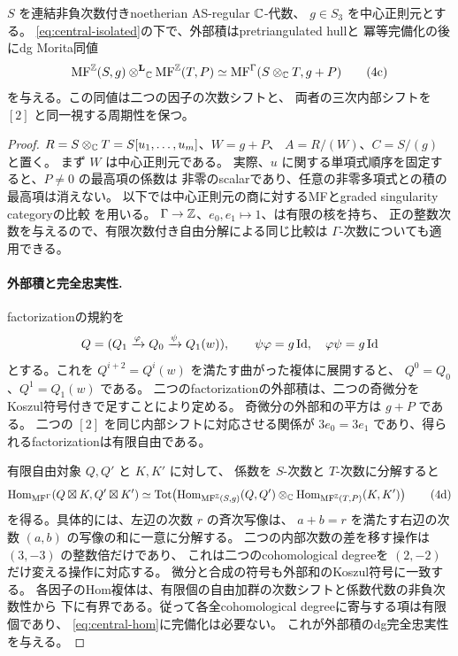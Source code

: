 \begin{lemma}[任意の孤立中心三次式に対する外部積]\label{lem:TS}
 \(S\) を連結非負次数付きnoetherian AS-regular \(\mathbb C\)-代数、
 \(g\in S_3\) を中心正則元とする。
 \eqref{eq:central-isolated}の下で、外部積はpretriangulated hullと
 冪等完備化の後にdg Morita同値
 \[
 \operatorname{MF}^\mathbb Z(S,g)\mathbin{\otimes^{\mathbf L}}_\mathbb C\operatorname{MF}^\mathbb Z(T,P)
 \simeq
 \operatorname{MF}^\Gamma(S\otimes_\mathbb C T,g+P)                             \tag{4c}\label{eq:central-TS}
 \]
 を与える。この同値は二つの因子の次数シフトと、
 両者の三次内部シフトを \([2]\) と同一視する周期性を保つ。
\end{lemma}
\begin{proof}
 \(R=S\otimes_\mathbb C T=S[u_1,\ldots,u_m]\)、\(W=g+P\)、
 \(A=R/(W)\)、\(C=S/(g)\) と置く。
 まず \(W\) は中心正則元である。
 実際、\(u\) に関する単項式順序を固定すると、\(P\ne0\) の最高項の係数は
 非零のscalarであり、任意の非零多項式との積の最高項は消えない。
 以下では中心正則元の商に対するMFとgraded singularity categoryの比較
 \cite[Theorem 5.8]{CCKM}を用いる。
 \(\Gamma\to\mathbb Z\)、\(e_0,e_1\mapsto1\)、は有限の核を持ち、
 正の整数次数を与えるので、有限次数付き自由分解による同じ比較は
 \(\Gamma\)-次数についても適用できる。

 \paragraph{外部積と完全忠実性.}
 factorizationの規約を
 \[
 Q=(Q_1\xrightarrow{\varphi}Q_0
                  \xrightarrow{\psi}Q_1(w)),\qquad
 \psi\varphi=g\operatorname{Id},\quad\varphi\psi=g\operatorname{Id}
 \]
 とする。これを \(Q^{i+2}=Q^i(w)\) を満たす曲がった複体に展開すると、
 \(Q^0=Q_0\)、\(Q^1=Q_1(w)\) である。
 二つのfactorizationの外部積は、二つの奇微分をKoszul符号付きで足すことにより定める。
 奇微分の外部和の平方は \(g+P\) である。
 二つの \([2]\) を同じ内部シフトに対応させる関係が
 \(3e_0=3e_1\) であり、得られるfactorizationは有限自由である。

 有限自由対象 \(Q,Q'\) と \(K,K'\) に対して、
 係数を \(S\)-次数と \(T\)-次数に分解すると
 \[
 \operatorname{Hom}_{\operatorname{MF}^\Gamma}(Q\boxtimes K,Q'\boxtimes K')
 \simeq
 \operatorname{Tot}\!\left(
   \operatorname{Hom}_{\operatorname{MF}^\mathbb Z(S,g)}(Q,Q')\otimes_\mathbb C
   \operatorname{Hom}_{\operatorname{MF}^\mathbb Z(T,P)}(K,K')\right)                         \tag{4d}\label{eq:central-hom}
 \]
 を得る。具体的には、左辺の次数 \(r\) の斉次写像は、
 \(a+b=r\) を満たす右辺の次数 \((a,b)\) の写像の和に一意に分解する。
 二つの内部次数の差を移す操作は \((3,-3)\) の整数倍だけであり、
 これは二つのcohomological degreeを \((2,-2)\) だけ変える操作に対応する。
 微分と合成の符号も外部和のKoszul符号に一致する。
 各因子のHom複体は、有限個の自由加群の次数シフトと係数代数の非負次数性から
 下に有界である。従って各全cohomological degreeに寄与する項は有限個であり、
 \eqref{eq:central-hom}に完備化は必要ない。
 これが外部積のdg完全忠実性を与える。


\end{proof}
